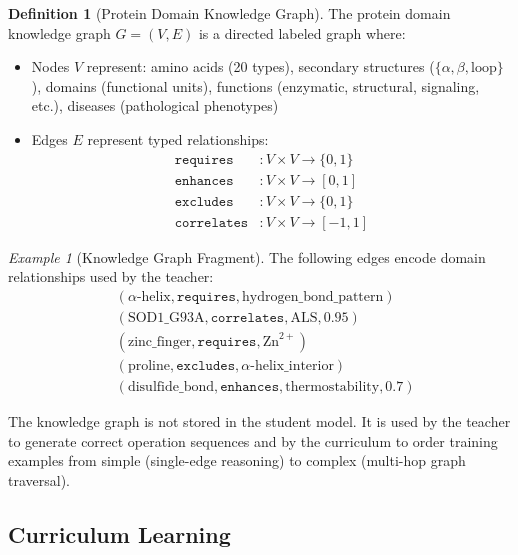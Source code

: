 \documentclass[11pt,twocolumn,a4paper]{article}
\theoremstyle{definition}
\newtheorem{definition}[theorem]{Definition}
\theoremstyle{remark}
\newtheorem{example}[theorem]{Example}
\begin{document}
\begin{definition}[Protein Domain Knowledge Graph]
\label{def:knowledge_graph}
The protein domain knowledge graph $G = (V, E)$ is a directed labeled graph where:
\begin{itemize}
    \item Nodes $V$ represent: amino acids (20 types), secondary structures ($\{\alpha, \beta, \text{loop}\}$), domains (functional units), functions (enzymatic, structural, signaling, etc.), diseases (pathological phenotypes)
    \item Edges $E$ represent typed relationships:
    \begin{align}
    \texttt{requires} &: V \times V \to \{0, 1\} \\
    \texttt{enhances} &: V \times V \to [0, 1] \\
    \texttt{excludes} &: V \times V \to \{0, 1\} \\
    \texttt{correlates} &: V \times V \to [-1, 1]
    \end{align}
\end{itemize}
\end{definition}

\begin{example}[Knowledge Graph Fragment]
\label{ex:knowledge_graph}
The following edges encode domain relationships used by the teacher:
\begin{align}
&(\alpha\text{-helix}, \texttt{requires}, \text{hydrogen\_bond\_pattern}) \\
&(\text{SOD1\_G93A}, \texttt{correlates}, \text{ALS}, 0.95) \\
&(\text{zinc\_finger}, \texttt{requires}, \text{Zn}^{2+}) \\
&(\text{proline}, \texttt{excludes}, \alpha\text{-helix\_interior}) \\
&(\text{disulfide\_bond}, \texttt{enhances}, \text{thermostability}, 0.7)
\end{align}
\end{example}

The knowledge graph is not stored in the student model. It is used by the teacher to generate correct operation sequences and by the curriculum to order training examples from simple (single-edge reasoning) to complex (multi-hop graph traversal).

\subsection{Curriculum Learning}
\end{document}
